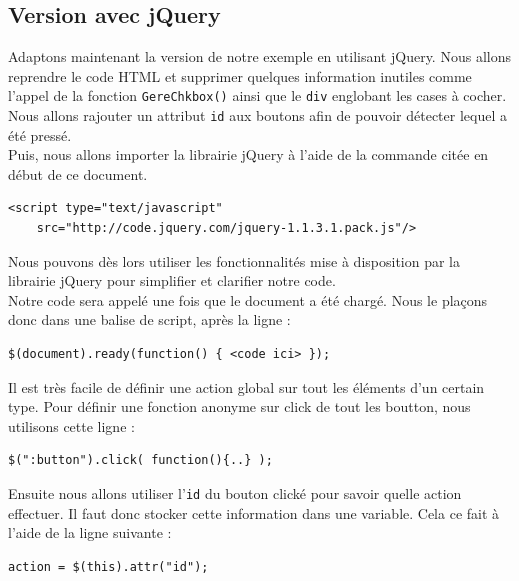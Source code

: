 \documentclass[10pt,a4paper,titlepage]{article}
\begin{document}
\subsection{Version avec jQuery}

Adaptons maintenant la version de notre exemple en utilisant jQuery. Nous allons reprendre le code HTML et supprimer quelques information inutiles comme l'appel de la fonction \texttt{GereChkbox()} ainsi que le \texttt{div} englobant les cases à cocher. \\

Nous allons rajouter un attribut \texttt{id} aux boutons afin de pouvoir détecter lequel a été pressé. \\

Puis, nous allons importer la librairie jQuery à l'aide de la commande citée en début de ce document. 

\begin{lstlisting}
<script type="text/javascript" 
	src="http://code.jquery.com/jquery-1.1.3.1.pack.js"/>
\end{lstlisting}

Nous pouvons dès lors utiliser les fonctionnalités mise à disposition par la librairie jQuery pour simplifier et clarifier notre code. \\

Notre code sera appelé une fois que le document a été chargé. Nous le plaçons donc dans une balise de script, après la ligne :

\begin{lstlisting}
$(document).ready(function() { <code ici> });
\end{lstlisting}

Il est très facile de définir une action global sur tout les éléments d'un certain type. Pour définir une fonction anonyme sur click de tout les boutton, nous utilisons cette ligne : \\

\begin{lstlisting}
$(":button").click( function(){..} );
\end{lstlisting}

Ensuite nous allons utiliser l'\texttt{id} du bouton clické pour savoir quelle action effectuer. Il faut donc stocker cette information dans une variable. Cela ce fait à l'aide de la ligne suivante : \\

\begin{lstlisting}
action = $(this).attr("id");
\end{lstlisting}
\end{document}
